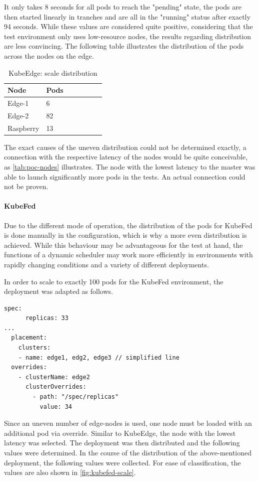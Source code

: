 \documentclass[MIC,Master,english]{twbook}%
\begin{document}
It only takes 8 seconds for all pods to reach the "pending" state, the pods are then started linearly in tranches and are all in the "running" status after exactly 94 seconds. While these values are considered quite positive, considering that the test environment only uses low-resource nodes, the results regarding distribution are less convincing. The following table illustrates the distribution of the pods across the nodes on the edge.

\begin{table}[ht]
    \begin{center}
        \begin{tabular}{|l|l|l|l|l|l|l|}
            \hline
            Node & Pods \\
            \hline
            Edge-1 & 6 \\
            Edge-2 & 82 \\
            Raspberry & 13 \\
            \hline
        \end{tabular}
        \caption{KubeEdge: scale distribution}
        \label{tab:ke-scale-distribution}
    \end{center}
\end{table}

The exact causes of the uneven distribution could not be determined exactly, a connection with the respective latency of the nodes would be quite conceivable, as \autoref{tab:poc-nodes} illustrates. The node with the lowest latency to the master was able to launch significantly more pods in the tests. An actual connection could not be proven.

\paragraph{KubeFed} Due to the different mode of operation, the distribution of the pods for KubeFed is done manually in the configuration, which is why a more even distribution is achieved. While this behaviour may be advantageous for the test at hand, the functions of a dynamic scheduler may work more efficiently in environments with rapidly changing conditions and a variety of different deployments. \par
In order to scale to exactly 100 pods for the KubeFed environment, the deployment was adapted as follows.
\vspace{\baselineskip}
\begin{lstlisting}[caption={KubeFed scale adaptations},captionpos=b]
    spec:
      replicas: 33
...
  placement:
    clusters:
    - name: edge1, edg2, edge3 // simplified line
  overrides:
    - clusterName: edge2
      clusterOverrides:
        - path: "/spec/replicas"
          value: 34
\end{lstlisting}
\par
Since an uneven number of edge-nodes is used, one node must be loaded with an additional pod via override. Similar to KubeEdge, the node with the lowest latency was selected. The deployment was then distributed and the following values were determined. In the course of the distribution of the above-mentioned deployment, the following values were collected. For ease of classification, the values are also shown in \autoref{fig:kubefed-scale}.
\end{document}
